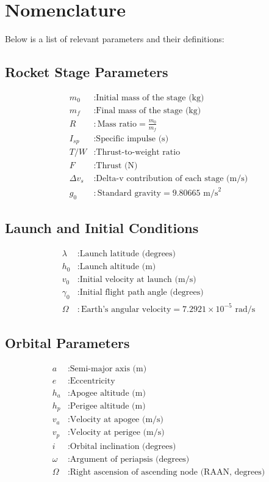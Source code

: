 \documentclass[a4paper,12pt]{article}
\begin{document}
\section{Nomenclature}
Below is a list of relevant parameters and their definitions:

\subsection{Rocket Stage Parameters}
\begin{align*}
    m_0 & : \text{Initial mass of the stage (kg)} \\
    m_f & : \text{Final mass of the stage (kg)} \\
    R   & : \text{Mass ratio} = \frac{m_0}{m_f} \\
    I_{sp} & : \text{Specific impulse (s)} \\
    T/W  & : \text{Thrust-to-weight ratio} \\
    F    & : \text{Thrust (N)} \\
    \Delta v_s & : \text{Delta-v contribution of each stage (m/s)} \\
    g_0  & : \text{Standard gravity} = 9.80665 \text{ m/s}^2
\end{align*}

\subsection{Launch and Initial Conditions}
\begin{align*}
    \lambda & : \text{Launch latitude (degrees)} \\
    h_0 & : \text{Launch altitude (m)} \\
    v_0 & : \text{Initial velocity at launch (m/s)} \\
    \gamma_0 & : \text{Initial flight path angle (degrees)} \\
    \Omega & : \text{Earth’s angular velocity} = 7.2921 \times 10^{-5} \text{ rad/s}
\end{align*}

\subsection{Orbital Parameters}
\begin{align*}
    a & : \text{Semi-major axis (m)} \\
    e & : \text{Eccentricity} \\
    h_a & : \text{Apogee altitude (m)} \\
    h_p & : \text{Perigee altitude (m)} \\
    v_a & : \text{Velocity at apogee (m/s)} \\
    v_p & : \text{Velocity at perigee (m/s)} \\
    i & : \text{Orbital inclination (degrees)} \\
    \omega & : \text{Argument of periapsis (degrees)} \\
    \Omega & : \text{Right ascension of ascending node (RAAN, degrees)}
\end{align*}
\end{document}
